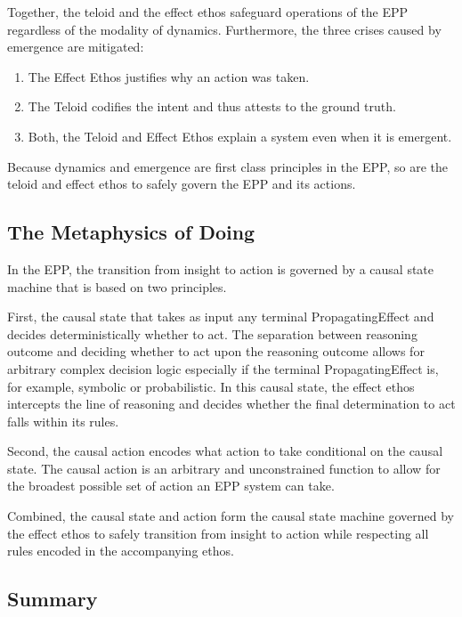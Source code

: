 Together, the teloid and the effect ethos safeguard operations of the EPP regardless of the modality of dynamics. Furthermore, the three crises caused by emergence are mitigated:

\begin{enumerate}
	\item The Effect Ethos justifies why an action was taken. 
	\item The Teloid codifies the intent and thus attests to the ground truth.
	\item Both, the Teloid and Effect Ethos explain a system even when it is emergent.
\end{enumerate}

Because dynamics and emergence are first class principles in the EPP, so are the
teloid and effect ethos to safely govern the EPP and its actions. 

\subsection{The Metaphysics of Doing} 
\label{sec:metaphysics_doing}

In the EPP, the transition from insight to action is governed by a causal state machine that is based on two principles.

 First, the causal state that takes as input any terminal PropagatingEffect and decides deterministically whether to act. The separation between reasoning outcome and deciding whether to act upon the reasoning outcome allows for arbitrary complex decision logic especially if the terminal PropagatingEffect is, for example, symbolic or probabilistic. In this causal state, the effect ethos intercepts the line of reasoning and decides whether the final determination to act falls within its rules. 
 
 Second, the causal action encodes what action to take conditional on the causal state. The causal action is an arbitrary and unconstrained function to allow for the broadest possible set of action an EPP system can take. 
 
 Combined, the causal state and action form the causal state machine governed by the effect ethos to safely transition from insight to action while respecting all rules encoded in the accompanying ethos. 

\subsection{Summary} 
\label{sec:metaphysics_summary}

